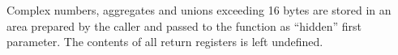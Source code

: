 Complex numbers, aggregates and unions exceeding 16 bytes are stored
in an area prepared by the caller and passed to the function as
``hidden'' first parameter.  The contents of all return registers is
left undefined.



